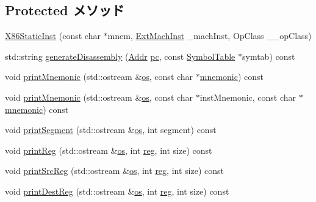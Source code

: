 \subsection*{Protected メソッド}
\begin{DoxyCompactItemize}
\item 
\hyperlink{classX86ISA_1_1X86StaticInst_a2feb4b016c2dd165d76bbbb6064dfe43}{X86StaticInst} (const char $\ast$mnem, \hyperlink{structX86ISA_1_1ExtMachInst}{ExtMachInst} \_\-machInst, OpClass \_\-\_\-opClass)
\item 
std::string \hyperlink{classX86ISA_1_1X86StaticInst_a95d323a22a5f07e14d6b4c9385a91896}{generateDisassembly} (\hyperlink{base_2types_8hh_af1bb03d6a4ee096394a6749f0a169232}{Addr} \hyperlink{namespaceX86ISA_aecb63c74e066ecd98e04d057e39028c9}{pc}, const \hyperlink{classSymbolTable}{SymbolTable} $\ast$symtab) const 
\item 
void \hyperlink{classX86ISA_1_1X86StaticInst_a298e3bb3bf0f69614fcddceb66eda6a1}{printMnemonic} (std::ostream \&\hyperlink{namespaceX86ISA_a6b6e6ba763e7eaf46ac5b6372ca98d30}{os}, const char $\ast$\hyperlink{classStaticInst_adfacb526b8ab378bf36f1324303635d0}{mnemonic}) const 
\item 
void \hyperlink{classX86ISA_1_1X86StaticInst_a4166e37250db584e4d5053f23c9900c3}{printMnemonic} (std::ostream \&\hyperlink{namespaceX86ISA_a6b6e6ba763e7eaf46ac5b6372ca98d30}{os}, const char $\ast$instMnemonic, const char $\ast$\hyperlink{classStaticInst_adfacb526b8ab378bf36f1324303635d0}{mnemonic}) const 
\item 
void \hyperlink{classX86ISA_1_1X86StaticInst_a97854c90239263d52dfedfd587769493}{printSegment} (std::ostream \&\hyperlink{namespaceX86ISA_a6b6e6ba763e7eaf46ac5b6372ca98d30}{os}, int segment) const 
\item 
void \hyperlink{classX86ISA_1_1X86StaticInst_a895eba453d8d839cbc6ec699ceb8a698}{printReg} (std::ostream \&\hyperlink{namespaceX86ISA_a6b6e6ba763e7eaf46ac5b6372ca98d30}{os}, int \hyperlink{namespaceX86ISA_aeeb02ad833ab76f3430553ef93213a6b}{reg}, int size) const 
\item 
void \hyperlink{classX86ISA_1_1X86StaticInst_abc6c6b8e210a0a3ad80ae6f8f3ef1e9b}{printSrcReg} (std::ostream \&\hyperlink{namespaceX86ISA_a6b6e6ba763e7eaf46ac5b6372ca98d30}{os}, int \hyperlink{namespaceX86ISA_aeeb02ad833ab76f3430553ef93213a6b}{reg}, int size) const 
\item 
void \hyperlink{classX86ISA_1_1X86StaticInst_ac7fb2d56c35ab7ecd81be0e2838d860b}{printDestReg} (std::ostream \&\hyperlink{namespaceX86ISA_a6b6e6ba763e7eaf46ac5b6372ca98d30}{os}, int \hyperlink{namespaceX86ISA_aeeb02ad833ab76f3430553ef93213a6b}{reg}, int size) const 

\end{DoxyCompactItemize}
